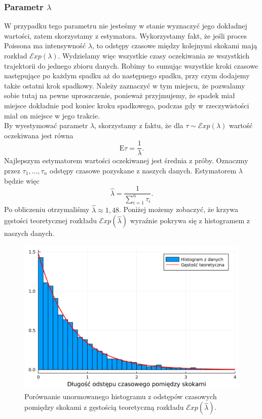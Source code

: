 \documentclass[12pt]{mwart}
\begin{document}
	\subsubsection{Parametr {\boldmath $\lambda$}}
	\noindent W przypadku tego parametru nie jesteśmy w stanie wyznaczyć jego dokładnej wartości, zatem skorzystamy z estymatora. Wykorzystamy fakt, że jeśli proces Poissona ma intensywność $\lambda$, to odstępy czasowe między kolejnymi skokami mają rozkład $\mathcal{E}xp(\lambda)$. Wydzielamy więc wszystkie czasy oczekiwania ze wszystkich trajektorii do jednego zbioru danych. Robimy to sumując wszystkie kroki czasowe następujące po każdym spadku aż do następnego spadku, przy czym dodajemy także ostatni krok spadkowy. Należy zaznaczyć w tym miejscu, że pozwalamy sobie tutaj na pewne uproszczenie, ponieważ przyjmujemy, że spadek miał miejsce dokładnie pod koniec kroku spadkowego, podczas gdy w rzeczywistości miał on miejsce w jego trakcie.\vspace{1.5mm}\\
	By wyestymować parametr $\lambda$, skorzystamy z faktu, że dla $\tau \sim \mathcal{E}xp(\lambda)$ wartość oczekiwana jest równa
	$$ \mathrm{E}\tau = \frac{1}{\lambda}. $$
	Najlepszym estymatorem wartości oczekiwanej jest średnia z próby. Oznaczmy przez $\tau_1, \dots, \tau_n$ odstępy czasowe pozyskane z naszych danych. Estymatorem $\lambda$ będzie więc
	$$ \widehat{\lambda} = \frac{1}{\sum\limits_{i=1}^n \tau_i}. $$
	Po obliczeniu otrzymaliśmy $\widehat{\lambda} \approx 1,48$. Poniżej możemy zobaczyć, że krzywa gęstości teoretycznej rozkładu $\mathcal{E}xp\left(\widehat{\lambda}\right)$ wyraźnie pokrywa się z histogramem z naszych danych.
	
	\begin{figure}[H]
		\centering
		\includegraphics[scale=0.1]{fig/lambda.png}
		\caption{Porównanie unormowanego histogramu z odstępów czasowych pomiędzy skokami z gęstością teoretyczną rozkładu $\mathcal{E}xp\left(\widehat{\lambda}\right)$.}
	\end{figure}
	
\end{document}
